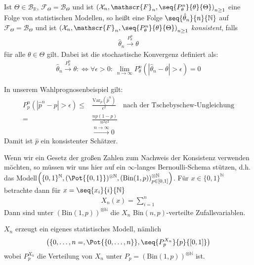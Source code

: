 \documentclass[a4paper]{scrartcl}
\begin{document}
		\begin{definition}
			Ist $\Theta\in\mathscr{B}_\mathbb{R}$, $\mathscr{F}_\Theta=\mathscr{B}_\Theta$ und ist $\left(\mathcal{X}_n,\mathscr{F}_n,\seq{P_\theta^n}{\theta}{\Theta}\right)_{n\ge 1}$ eine Folge von statistischen Modellen, so heißt eine Folge $\seq{\hat{\theta}_n}{n}{\mathbb{N}}$ auf $\mathscr{F}_\Theta=\mathscr{B}_\Theta$ und ist $\left(\mathcal{X}_n,\mathscr{F}_n,\seq{P_\theta^n}{\theta}{\Theta}\right)_{n\ge 1}$ \emph{konsistent}, falls
			\begin{align*}
				\hat{\theta}_n\xrightarrow{P_\theta^n}\theta
			\end{align*}
			für alle $\theta\in\Theta$ gilt. Dabei ist die stochastische Konvergenz definiert als:
			\begin{align*}
				\hat{\theta}_n\xrightarrow{P_\theta^n}\theta\colon\Leftrightarrow\forall\epsilon>0\colon~\lim_{n\to\infty}P_\theta^n\left(\left|\hat{\theta}_n-\theta\right|>\epsilon\right)=0
			\end{align*}
		\end{definition}
		\begin{example}
			In unserem Wahlprognosenbeispiel gilt:
			\begin{align*}
				P_p^n\left(\left|\hat{p}^n-p\right|>\epsilon\right)\le&\frac{\text{Var}_p\left(\hat{p}^n\right)}{\epsilon^2}\quad\text{nach der Tschebyschew-Ungleichung}\\
				=&\frac{np(1-p)}{n^2\epsilon^2}\\
				&\xrightarrow{n\to\infty}0
			\end{align*}
			Damit ist $\hat{p}$ ein konsistenter Schätzer.
		\end{example}
		\begin{remark}
			Wenn wir ein Gesetz der großen Zahlen zum Nachweis der Konsistenz verwenden möchten, so müssen wir uns hier auf ein $\infty$-langes Bernoulli-Schema stützen, d.h. das Modell$\left(\{0,1\}^\mathbb{N},(\Pot{\{0,1\}})^{\otimes\mathbb{N}},(\text{Bin}(1,p))_{p\in[0,1]}^{\otimes\mathbb{N}}\right)$. Für $x\in\{0,1\}^\mathbb{N}$ betrachte dann für $x=\seq{x_i}{i}{\mathbb{N}}$
			\begin{align*}
				X_n(x)=\sum_{i=1}^n
			\end{align*}
			Dann sind unter $(\text{Bin}(1,p))^{\otimes \mathbb{N}}$ die $X_n$ Bin$(n,p)$-verteilte Zufallsvariablen.
			
			$X_n$ erzeugt ein eigenes statistisches Modell, nämlich 
			\begin{align*}
				\left(\{0,\dots,n=,\Pot{\{0,\dots,n\}},\seq{P_p^{X_n}}{p}{[0,1]}\right)
			\end{align*}
			wobei $P_p^{X_n}$ die Verteilung von $X_n$ unter $P_p=(\text{Bin}(1,p))^{\otimes \mathbb{N}}$ ist.
		\end{remark}
\end{document}
